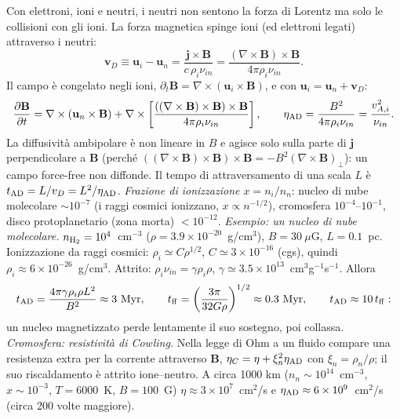 Con elettroni, ioni e neutri, i neutri non sentono la forza di Lorentz ma solo le collisioni con gli ioni. La forza magnetica spinge ioni (ed elettroni legati) attraverso i neutri:
\begin{equation}
\mathbf{v}_D\equiv\mathbf{u}_i-\mathbf{u}_n=\frac{\mathbf{j}\times\mathbf{B}}{c\,\rho_i\nu_{in}}=\frac{(\nabla\times\mathbf{B})\times\mathbf{B}}{4\pi\rho_i\nu_{in}} .
\end{equation}
Il campo è congelato negli ioni, $\partial_t\mathbf{B}=\nabla\times(\mathbf{u}_i\times\mathbf{B})$, e con $\mathbf{u}_i=\mathbf{u}_n+\mathbf{v}_D$:
\begin{equation}
\frac{\partial\mathbf{B}}{\partial t}=\nabla\times(\mathbf{u}_n\times\mathbf{B})+\nabla\times\left[\frac{\left((\nabla\times\mathbf{B})\times\mathbf{B}\right)\times\mathbf{B}}{4\pi\rho_i\nu_{in}}\right],\qquad\eta_{\rm AD}=\frac{B^2}{4\pi\rho_i\nu_{in}}=\frac{v_{A,i}^2}{\nu_{in}} .
\end{equation}
La diffusività ambipolare è non lineare in $B$ e agisce solo sulla parte di $\mathbf{j}$ perpendicolare a $\mathbf{B}$ (perché $((\nabla\times\mathbf{B})\times\mathbf{B})\times\mathbf{B}=-B^2(\nabla\times\mathbf{B})_\perp$): un campo force-free non diffonde. Il tempo di attraversamento di una scala $L$ è $t_{\rm AD}=L/v_D=L^2/\eta_{\rm AD}$.
\emph{Frazione di ionizzazione $x=n_i/n_n$}: nucleo di nube molecolare $\sim10^{-7}$ (i raggi cosmici ionizzano, $x\propto n^{-1/2}$), cromosfera $10^{-4}$--$10^{-1}$, disco protoplanetario (zona morta) $<10^{-12}$.
\emph{Esempio: un nucleo di nube molecolare.} $n_{\rm H_2}=10^4$~cm$^{-3}$ ($\rho=3.9\times10^{-20}$~g/cm$^3$), $B=30~\mu$G, $L=0.1$~pc. Ionizzazione da raggi cosmici: $\rho_i\simeq C\rho^{1/2}$, $C\simeq3\times10^{-16}$ (cgs), quindi $\rho_i\approx6\times10^{-26}$~g/cm$^3$. Attrito: $\rho_i\nu_{in}=\gamma\rho_i\rho$, $\gamma\simeq3.5\times10^{13}$~cm$^3$g$^{-1}$s$^{-1}$. Allora
\begin{equation}
t_{\rm AD}=\frac{4\pi\gamma\rho_i\rho L^2}{B^2}\approx3\ \mathrm{Myr},\qquad t_{\rm ff}=\left(\frac{3\pi}{32G\rho}\right)^{1/2}\approx0.3\ \mathrm{Myr},\qquad t_{\rm AD}\approx10\,t_{\rm ff}:
\end{equation}
un nucleo magnetizzato perde lentamente il suo sostegno, poi collassa.
\emph{Cromosfera: resistività di Cowling.} Nella legge di Ohm a un fluido compare una resistenza extra per la corrente attraverso $\mathbf{B}$, $\eta_C=\eta+\xi_n^2\eta_{\rm AD}$ con $\xi_n=\rho_n/\rho$; il suo riscaldamento è attrito ione--neutro. A circa 1000 km ($n_n\sim10^{14}$~cm$^{-3}$, $x\sim10^{-3}$, $T=6000$~K, $B=100$~G) $\eta\approx3\times10^7$~cm$^2$/s e $\eta_{\rm AD}\approx6\times10^9$~cm$^2$/s (circa 200 volte maggiore).

